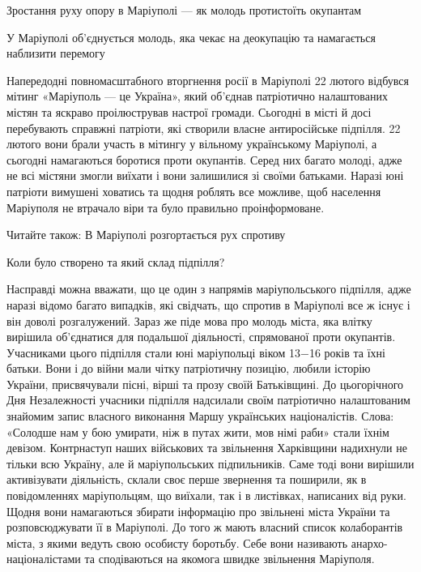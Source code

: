  
 
 
 
 

Зростання руху опору в Маріуполі — як молодь протистоїть окупантам

У Маріуполі об'єднується молодь, яка чекає на деокупацію та намагається
наблизити перемогу

Напередодні повномасштабного вторгнення росії в Маріуполі 22 лютого відбувся
мітинг «Маріуполь — це Україна», який об'єднав патріотично налаштованих містян
та яскраво проілюстрував настрої громади. Сьогодні в місті й досі перебувають
справжні патріоти, які створили власне антиросійське підпілля. 22 лютого вони
брали участь в мітингу у вільному українському Маріуполі, а сьогодні
намагаються боротися проти окупантів. Серед них багато молоді, адже не всі
містяни змогли виїхати і вони залишилися зі своїми батьками. Наразі юні
патріоти вимушені ховатись та щодня роблять все можливе, щоб населення
Маріуполя не втрачало віри та було правильно проінформоване.

Читайте також: В Маріуполі розгортається рух спротиву

Коли було створено та який склад підпілля? 

Насправді можна вважати, що це один з напрямів маріупольського підпілля, адже
наразі відомо багато випадків, які свідчать, що спротив в Маріуполі все ж існує
і він доволі розгалужений. Зараз же піде мова про молодь міста, яка влітку
вирішила об'єднатися для подальшої діяльності, спрямованої проти окупантів.
Учасниками цього підпілля стали юні маріупольці віком 13−16 років та їхні
батьки. Вони і до війни мали чітку патріотичну позицію, любили історію України,
присвячували пісні, вірші та прозу своїй Батьківщині. До цьогорічного Дня
Незалежності учасники підпілля надсилали своїм патріотично налаштованим
знайомим запис власного виконання Маршу українських націоналістів. Слова:
«Солодше нам у бою умирати, ніж в путах жити, мов німі раби» стали їхнім
девізом. Контрнаступ наших військових та звільнення Харківщини надихнули не
тільки всю Україну, але й маріупольських підпильників. Саме тоді вони вирішили
активізувати діяльність, склали своє перше звернення та поширили, як в
повідомленнях маріупольцям, що виїхали, так і в листівках, написаних від руки.
Щодня вони намагаються збирати інформацію про звільнені міста України та
розповсюджувати її в Маріуполі. До того ж мають власний список колаборантів
міста, з якими ведуть свою особисту боротьбу. Себе вони називають
анархо-націоналістами та сподіваються на якомога швидке звільнення Маріуполя.

